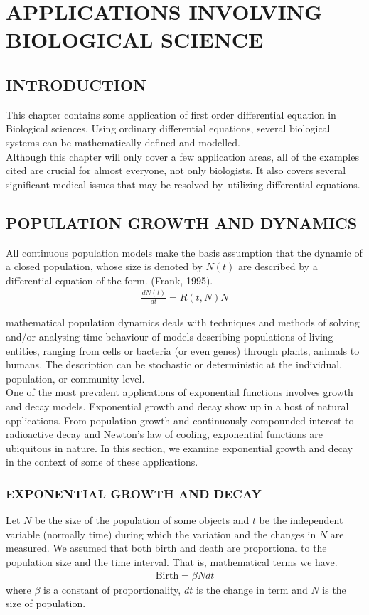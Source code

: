 \documentclass[11pt]{report}
\newcommand{\NI}{\noindent}
\begin{document}
	
	\chapter{APPLICATIONS INVOLVING BIOLOGICAL SCIENCE}
	\section{INTRODUCTION}
	This chapter contains some application of first order differential equation in Biological sciences. Using ordinary differential equations, several biological systems can be mathematically defined and modelled. \\

	\NI Although this chapter will only cover a few application areas, all of the examples cited are crucial for almost everyone, not only biologists. It also covers several significant medical issues that may be resolved by utilizing differential equations.

	\section{POPULATION GROWTH AND DYNAMICS}
	All continuous population models make the basis assumption that the dynamic of a closed population, whose size is denoted by $N(t)$ are described by a differential equation of the form. (Frank, 1995).
	\begin{eqnarray}
		\frac{dN(t)}{dt} = R(t,N)N
	\end{eqnarray} 
	
	mathematical population dynamics deals with techniques and methods of solving and/or analysing time behaviour of models describing populations of living entities, ranging from cells or bacteria (or even genes) through plants, animals to humans. The description can be stochastic or deterministic at the individual, population, or community level.\\
	
	\NI One of the most prevalent applications of exponential functions involves growth and decay models. Exponential growth and decay show up in a host of natural applications. From population growth and continuously compounded interest to radioactive decay and Newton’s law of cooling, exponential functions are ubiquitous in nature. In this section, we examine exponential growth and decay in the context of some of these applications.

	\subsection{EXPONENTIAL GROWTH AND DECAY}
	Let $N$ be the size of the population of some objects and $t$ be the independent variable (normally time) during which the variation and the changes in $N$ are measured. We assumed that both birth and death are proportional to the population size and the time interval. That is, mathematical terms we have. 
	\begin{eqnarray}
		\text{Birth} = \beta N dt
	\end{eqnarray}
	where $\beta$ is a constant of proportionality, $dt$ is the change in term and $N$ is the size of population.\\
	
\end{document}
